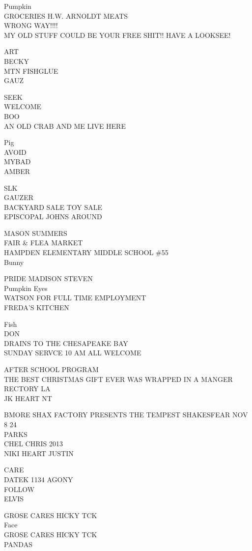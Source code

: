 \documentclass[10pt,letterpaper]{article}
\begin{document}
Pumpkin\\
GROCERIES H.W. ARNOLDT MEATS\\
WRONG WAY!!!!\\
MY OLD STUFF COULD BE YOUR FREE SHIT!! HAVE A LOOKSEE!

ART\\
BECKY\\
MTN FISHGLUE\\
GAUZ

SEEK\\
WELCOME\\
BOO\\
AN OLD CRAB AND ME LIVE HERE

Pig\\
AVOID\\
MYBAD\\
AMBER

SLK\\
GAUZER\\
BACKYARD SALE TOY SALE\\
EPISCOPAL JOHNS AROUND

MASON SUMMERS\\
FAIR \& FLEA MARKET\\
HAMPDEN ELEMENTARY MIDDLE SCHOOL \#55\\
Bunny

PRIDE MADISON STEVEN\\
Pumpkin Eyes\\
WATSON FOR FULL TIME EMPLOYMENT\\
FREDA'S KITCHEN

Fish\\
DON\\
DRAINS TO THE CHESAPEAKE BAY\\
SUNDAY SERVCE 10 AM ALL WELCOME

AFTER SCHOOL PROGRAM\\
THE BEST CHRISTMAS GIFT EVER WAS WRAPPED IN A MANGER\\
RECTORY LA\\
JK HEART NT

BMORE SHAX FACTORY PRESENTS THE TEMPEST SHAKESFEAR NOV 8 24\\
PARKS\\
CHEL CHRIS 2013\\
NIKI HEART JUSTIN

CARE\\
DATEK 1134 AGONY\\
FOLLOW\\
ELVIS

GROSE CARES HICKY TCK\\
Face\\
GROSE CARES HICKY TCK\\
PANDAS
\end{document}
